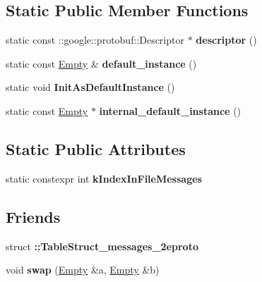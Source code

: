 \subsection*{Static Public Member Functions}
\begin{DoxyCompactItemize}
\item 
\mbox{\label{classtbMessages_1_1Empty_a4ce4c33a1420ad1d4618898c739544f6}} 
static const \+::google\+::protobuf\+::\+Descriptor $\ast$ {\bfseries descriptor} ()
\item 
\mbox{\label{classtbMessages_1_1Empty_aa8fd3af296539738b97b9f00d6e30ec6}} 
static const \hyperlink{classtbMessages_1_1Empty}{Empty} \& {\bfseries default\+\_\+instance} ()
\item 
\mbox{\label{classtbMessages_1_1Empty_ae2989c73d47aa01f3c39e7382c0a181d}} 
static void {\bfseries Init\+As\+Default\+Instance} ()
\item 
\mbox{\label{classtbMessages_1_1Empty_a4c31dee39671e45833f38972bfcdbacc}} 
static const \hyperlink{classtbMessages_1_1Empty}{Empty} $\ast$ {\bfseries internal\+\_\+default\+\_\+instance} ()
\end{DoxyCompactItemize}
\subsection*{Static Public Attributes}
\begin{DoxyCompactItemize}
\item 
static constexpr int {\bfseries k\+Index\+In\+File\+Messages}
\end{DoxyCompactItemize}
\subsection*{Friends}
\begin{DoxyCompactItemize}
\item 
\mbox{\label{classtbMessages_1_1Empty_a6669c254757d8a4b2e1f51c0da62dd91}} 
struct {\bfseries \+::\+Table\+Struct\+\_\+messages\+\_\+2eproto}
\item 
\mbox{\label{classtbMessages_1_1Empty_aa89f86120de5aa1f2151023feca8458e}} 
void {\bfseries swap} (\hyperlink{classtbMessages_1_1Empty}{Empty} \&a, \hyperlink{classtbMessages_1_1Empty}{Empty} \&b)
\end{DoxyCompactItemize}


